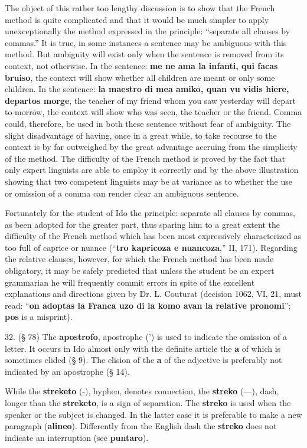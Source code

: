 The object of this rather too lengthy discussion is to show that the French method is quite complicated and that it would be much simpler to apply unexceptionally the method expressed in the principle: ``separate all clauses by commas.'' It is true, in some instances a sentence may be ambiguous with this method. But ambiguity will exist only when the sentence is removed from its context, not otherwise. In the sentence: \textbf{me ne ama la infanti, qui facas bruiso}, the context will show whether all children are meant or only some children. In the sentence: \textbf{la maestro di mea amiko, quan vu vidis hiere, departos morge}, the teacher of my friend whom you saw yesterday will depart to-morrow, the context will show who was seen, the teacher or the friend. Comma could, therefore, be used in both these sentence without fear of ambiguity. The slight disadvantage of having, once in a great while, to take recourse to the context is by far outweighed by the great advantage accruing from the simplicity of the method. The difficulty of the French method is proved by the fact that only expert linguists are able to employ it correctly and by the above illustration showing that two competent linguists may be at variance as to whether the use or omission of a comma can render clear an ambiguous sentence.

Fortunately for the student of Ido the principle: separate all clauses by commas, as been adopted for the greater part, thus sparing him to a great extent the difficulty of the French method which has been most expressively characterized as too full of caprice or nuance (``\textbf{tro kapricoza e nuancoza},'' II, 171). Regarding the relative clauses, however, for which the French method has been made obligatory, it may be safely predicted that unless the student be an expert grammarian he will frequently commit errors in spite of the excellent explanations and directions given by Dr. L. Couturat (decision 1062, VI, 21, must read: ``\textbf{on adoptas la Franca uzo di la komo avan la relative pronomi}''; \textbf{pos} is a misprint).

32. (§ 78) The \textbf{apostrofo}, apostrophe (') is used to indicate the omission of a letter. It occurs in Ido almost only with the definite article the \textbf{a} of which is sometimes elided (§ 9). The elision of the \textbf{a} of the adjective is preferably not indicated by an apostrophe (§ 14). %

While the \textbf{streketo} (-), hyphen, denotes connection, the \textbf{streko} (—), dash, longer than the \textbf{streketo}, is a sign of separation. The \textbf{streko} is used when the speaker or the subject is changed. In the latter case it is preferable to make a new paragraph (\textbf{alineo}). Differently from the English dash the \textbf{streko} does not indicate an interruption (see \textbf{puntaro}).


